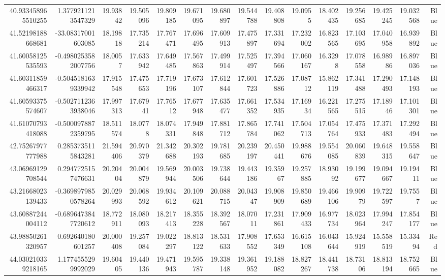\begin{center}
\begin{longtable}{rrrrrrrrrrrrrrr}
40.933458965510255 & 1.3779211213547329 & 19.93842 & 19.505096 & 19.809185 & 19.671095 & 19.680897 & 19.544788 & 19.408808 & 19.0955 & 18.402435 & 19.256685 & 19.425245 & 19.032568 & Blue \\
41.52198188668681 & -33.08317001603085 & 18.19818 & 17.735214 & 17.767471 & 17.696495 & 17.609913 & 17.475897 & 17.331694 & 17.232002 & 16.823565 & 17.103695 & 17.040958 & 16.939892 & Blue \\
41.60058125535593 & -0.4980253582007756 & 18.0057 & 17.633942 & 17.649485 & 17.567863 & 17.499914 & 17.525497 & 17.394566 & 17.060167 & 16.3298 & 17.078558 & 16.98986 & 16.897036 & Blue \\
41.60311859466317 & -0.5045181639339942 & 17.915548 & 17.475653 & 17.719196 & 17.673107 & 17.612844 & 17.601723 & 17.526886 & 17.08712 & 15.862119 & 17.341488 & 17.290493 & 17.148193 & Blue \\
41.60593375574607 & -0.5027112363938046 & 17.997313 & 17.67941 & 17.76512 & 17.677948 & 17.635477 & 17.661352 & 17.534935 & 17.16934 & 16.221565 & 17.275515 & 17.18946 & 17.101301 & Blue \\
41.61070793418088 & -0.5000978872359795 & 18.511574 & 18.0778 & 18.074331 & 17.949848 & 17.881712 & 17.865784 & 17.741062 & 17.504713 & 17.054764 & 17.475933 & 17.371483 & 17.292494 & Blue \\
42.75267977777988 & 0.2853735115843281 & 21.594406 & 20.970379 & 21.342688 & 20.302193 & 19.781685 & 20.239197 & 20.450441 & 19.988676 & 19.554085 & 20.060839 & 19.648315 & 19.558647 & Blue \\
43.06969129708544 & 0.2947725157476631 & 20.20404 & 20.004879 & 19.569944 & 20.003506 & 19.738644 & 19.443186 & 19.35967 & 19.257885 & 18.93092 & 19.199677 & 19.094667 & 19.19411 & Blue \\
43.21668023139433 & -0.3698979850578264 & 20.029993 & 20.068592 & 19.934612 & 20.109621 & 20.088715 & 20.04347 & 19.908909 & 19.850689 & 19.466106 & 19.90979 & 19.722597 & 19.7557 & Blue \\
43.60887244004112 & -0.6896473847720612 & 18.772911 & 18.080093 & 18.217413 & 18.355228 & 18.392567 & 18.07011 & 17.231861 & 17.909433 & 16.977734 & 18.023964 & 17.994247 & 17.854177 & Blue \\
43.98850261320957 & 0.692640180601257 & 20.000408 & 19.257084 & 19.022297 & 18.813122 & 18.531633 & 17.908552 & 17.653349 & 16.615108 & 16.043644 & 15.924919 & 15.558519 & 15.33494 & Red \\
44.030210339218165 & 1.1774555299992029 & 19.60405 & 19.440136 & 19.471943 & 19.595787 & 19.338148 & 19.361952 & 19.188082 & 18.827267 & 18.441738 & 18.73106 & 18.813194 & 18.752665 & Blue \\

\end{longtable}
\end{center}
